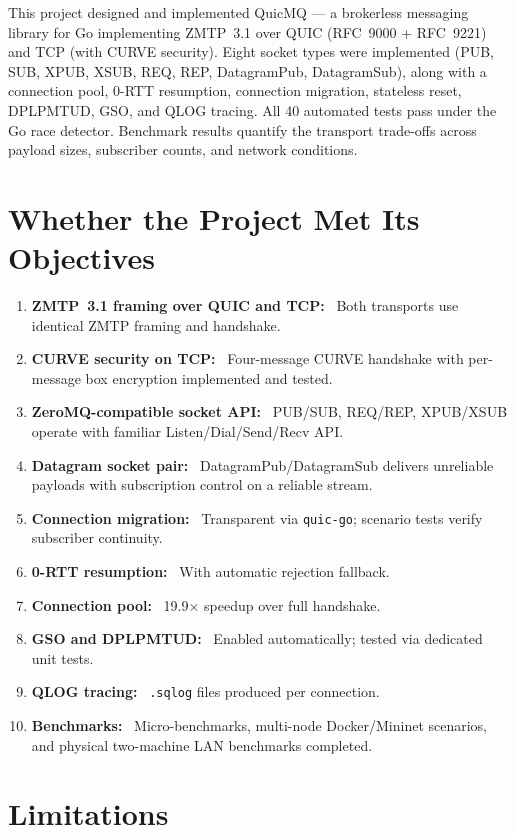 \documentclass[12pt, a4paper, oneside]{report}
\newcommand{\cmark}{\ding{51}}
\begin{document}
This project designed and implemented QuicMQ — a brokerless messaging library for Go implementing ZMTP~3.1 over QUIC (RFC~9000 + RFC~9221) and TCP (with CURVE security). Eight socket types were implemented (PUB, SUB, XPUB, XSUB, REQ, REP, DatagramPub, DatagramSub), along with a connection pool, 0-RTT resumption, connection migration, stateless reset, DPLPMTUD, GSO, and QLOG tracing. All 40 automated tests pass under the Go race detector. Benchmark results quantify the transport trade-offs across payload sizes, subscriber counts, and network conditions.

\section{Whether the Project Met Its Objectives}
\label{sec:objectives-met}

\begin{enumerate}
  \item \textbf{ZMTP~3.1 framing over QUIC and TCP:} \cmark\ Both transports use identical ZMTP framing and handshake.
  \item \textbf{CURVE security on TCP:} \cmark\ Four-message CURVE handshake with per-message box encryption implemented and tested.
  \item \textbf{ZeroMQ-compatible socket API:} \cmark\ PUB/SUB, REQ/REP, XPUB/XSUB operate with familiar Listen/Dial/Send/Recv API.
  \item \textbf{Datagram socket pair:} \cmark\ DatagramPub/DatagramSub delivers unreliable payloads with subscription control on a reliable stream.
  \item \textbf{Connection migration:} \cmark\ Transparent via \texttt{quic-go}; scenario tests verify subscriber continuity.
  \item \textbf{0-RTT resumption:} \cmark\ With automatic rejection fallback.
  \item \textbf{Connection pool:} \cmark\ 19.9$\times$ speedup over full handshake.
  \item \textbf{GSO and DPLPMTUD:} \cmark\ Enabled automatically; tested via dedicated unit tests.
  \item \textbf{QLOG tracing:} \cmark\ \texttt{.sqlog} files produced per connection.
  \item \textbf{Benchmarks:} \cmark\ Micro-benchmarks, multi-node Docker/Mininet scenarios, and physical two-machine LAN benchmarks completed.
\end{enumerate}

\section{Limitations}
\label{sec:limitations}
\end{document}
